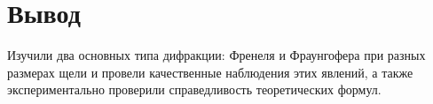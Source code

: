 \documentclass[a4paper, 12pt]{article}%
\begin{document}
\section*{Вывод}

Изучили два основных типа дифракции: Френеля и Фраунгофера при разных размерах щели и провели качественные наблюдения этих явлений, а также экспериментально проверили справедливость теоретических формул.  
\end{document}
